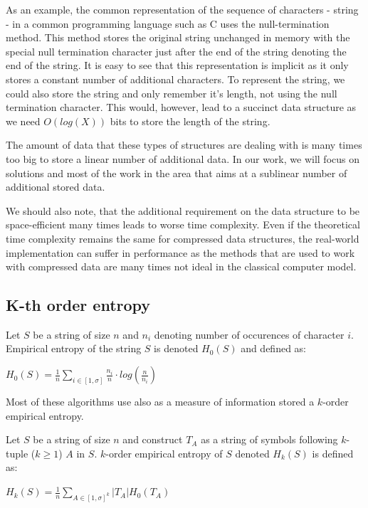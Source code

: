 As an example, the common representation of the sequence of characters - string - in a common programming language such as C uses the null-termination method. This method stores the original string unchanged in memory with the special null termination character just after the end of the string denoting the end of the string. It is easy to see that this representation is implicit as it only stores a constant number of additional characters. To represent the string, we could also store the string and only remember it's length, not using the null termination character. This would, however, lead to a succinct data structure as we need $O(log(X))$ bits to store the length of the string.

The amount of data that these types of structures are dealing with is many times too big to store a linear number of additional data. In our work, we will focus on solutions and most of the work in the area that aims at a sublinear number of additional stored data.

We should also note, that the additional requirement on the data structure to be space-efficient many times leads to worse time complexity. Even if the theoretical time complexity remains the same for compressed data structures, the real-world implementation can suffer in performance as the methods that are used to work with compressed data are many times not ideal in the classical computer model.

\subsection{K-th order entropy}

\begin{theorem}
Let $S$ be a string of size $n$ and $n_i$ denoting number of occurences of character
$i$. Empirical entropy of the string $S$ is denoted $H_0(S)$ and defined as:
\begin{center}
$H_0(S) = \frac{1}{n} \sum_{i \in [1, \sigma]} \frac{n_i}{n}\cdot log(\frac{n}{n_i})$
\end{center}
\end{theorem}

Most of these algorithms use also as a measure of information stored a $k$-order empirical entropy.

\begin{theorem}
Let $S$ be a string of size $n$ and construct $T_A$ as a string of symbols following $k$-tuple ($k \geq 1$) $A$ in $S$.
$k$-order empirical entropy of $S$ denoted $H_k(S)$ is defined as:
\begin{center}
$H_k(S) = \frac{1}{n} \sum_{A \in [1, \sigma ]^k} |T_A| H_0(T_A)$
\end{center}
\end{theorem}

